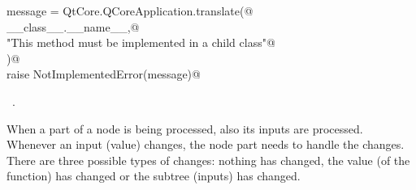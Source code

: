 \documentclass[
    a4paper,      %
    10pt,         %
    openright,    %
    notitlepage,  %
    parskip=half, %
]{scrreprt}       %
\theoremstyle{definition}                    %
\begin{document}
\begin{flushleft}
\begin{minipage}{\linewidth}
\begin{list}{}{}
\mbox{}\lstinline@        message = QtCore.QCoreApplication.translate(@\\
\mbox{}\lstinline@            __class__.__name__,@\\
\mbox{}\lstinline@            "This method must be implemented in a child class"@\\
\mbox{}\lstinline@        )@\\
\mbox{}\lstinline@        raise NotImplementedError(message)@\\
\mbox{}\lstinline@@{\NWsep}
\end{list}
\vspace{-1.5ex}
\footnotesize
\begin{list}{}{\setlength{\itemsep}{-\parsep}\setlength{\itemindent}{-\leftmargin}}
\item \NWtxtMacroRefIn\ .

\item{}
\end{list}
\end{minipage}\vspace{4ex}
\end{flushleft}
When a part of a node is being processed, also its inputs are processed.
Whenever an input (value) changes, the node part needs to handle the changes.
There are three possible types of changes: nothing has changed, the value (of
the function) has changed or the subtree (inputs) has changed.
\end{document}
